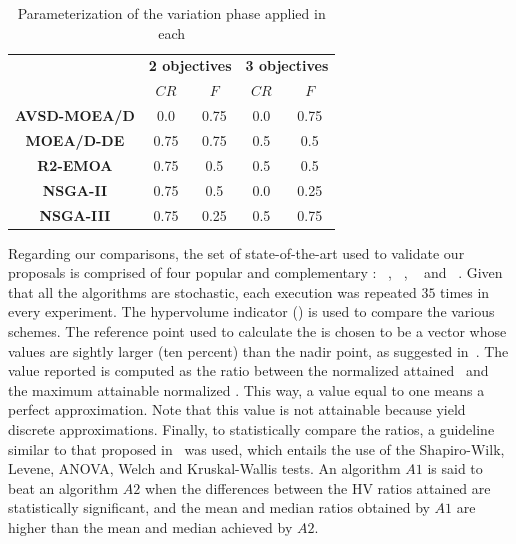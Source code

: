 \begin{table}[t]
\centering
\caption{Parameterization of the variation phase applied in each \MOEA{}}
\label{tab:tunning}
\begin{scriptsize}
\begin{tabular}{c|c|c|c|c}
\hline
\multirow{2}{*}{} &\multicolumn{2}{c|}{ \textbf{2 objectives} }& \multicolumn{2}{c}{\textbf{3 objectives} }\\ \cline{2-5} 
 & $CR$ & $F$ & $CR$ & $F$ \\ \hline
\textbf{AVSD-MOEA/D} & 0.0 & 0.75 & 0.0 & 0.75 \\ \hline
\textbf{MOEA/D-DE} & 0.75 & 0.75 & 0.5 & 0.5 \\ \hline
\textbf{R2-EMOA} & 0.75 & 0.5 & 0.5 & 0.5 \\ \hline
\textbf{NSGA-II} & 0.75 & 0.5 & 0.0 & 0.25 \\ \hline
\textbf{NSGA-III} & 0.75 & 0.25 & 0.5 & 0.75 \\ \hline
\end{tabular}%
\end{scriptsize}
\end{table}

Regarding our comparisons, the set of state-of-the-art \MOEAS{} used to validate our proposals is comprised of four 
popular and complementary \MOEAS{}: \NSGAII{}~\cite{deb2002fast}, \MOEADDE{}~\cite{zhang2009performance}, \RMOEA{}~\cite{trautmann2013r2} 
and \NSGAIII{}~\cite{deb2013evolutionary}.
%
%
%
Given that all the algorithms are stochastic, each execution was repeated $35$ times in every experiment.
%
The hypervolume indicator (\HV{}) is used to compare the various schemes.
%
The reference point used to calculate the \HV{} is chosen to be a vector whose values are sightly larger (ten percent) 
than the nadir point, as suggested in~\cite{ishibuchi2017reference}.
%
The value reported is computed as the ratio between the normalized \HV{} attained~\cite{li2014evolutionary} 
and the maximum attainable normalized \HV{}.
%
This way, a value equal to one means a perfect approximation.
%
Note that this value is not attainable because \MOEAS{} yield discrete approximations.
%
Finally, to statistically compare the \HV{} ratios, a guideline similar to that proposed in~\cite{durillo2010study} was used, 
which entails the use of the Shapiro-Wilk, Levene, ANOVA, Welch and Kruskal-Wallis tests.
%
An algorithm $A1$ is said to beat an algorithm $A2$ when the differences between the HV ratios attained are statistically significant, 
and the mean and median \HV{} ratios obtained by $A1$ are higher than the mean and median achieved by $A2$.

